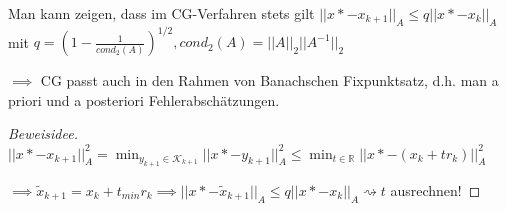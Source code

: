 \begin{remark}
	Man kann zeigen, dass im CG-Verfahren stets gilt $||x* - x_{k+1}||_A \leq q ||x* - x_k||_A$ mit $q = \left(1 - \frac{1}{cond_2(A)}\right)^{1/2}, cond_2(A) = ||A||_2 ||A^{-1}||_2$
	
	$\implies$ CG passt auch in den Rahmen von Banachschen Fixpunktsatz, d.h. man a priori und a posteriori Fehlerabschätzungen.
\end{remark}

\begin{proof}[Beweisidee]
	$||x* - x_{k+1}||_A^2 = \min_{y_{k+1} \in \mathcal{K}_{k+1}} ||x* - y_{k+1}||_A^2 \leq \min_{t \in \mathbb{R}} ||x* - (x_k + t r_k)||_A^2$
	
	$\implies \tilde{x}_{k+1} = x_k + t_{min}r_k \implies ||x* - \tilde{x}_{k+1}||_A \leq q ||x* - x_k||_A \rightsquigarrow t$ ausrechnen!
\end{proof}
